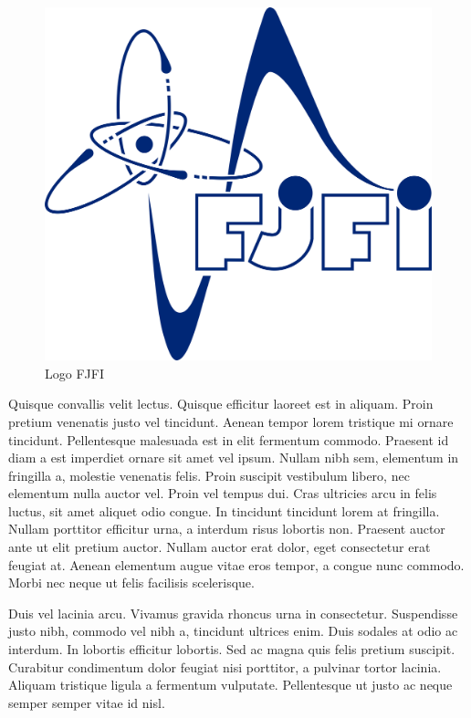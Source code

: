 \documentclass{article}
\begin{document}
\begin{figure}[!htp]
	\begin{center}
		\includegraphics[scale=0.1]{logo-fjfi.png}
	\end{center}
	\caption{Logo FJFI}
	\label{fig:logo-fjfi2}
\end{figure}

Quisque convallis velit lectus. Quisque efficitur laoreet est in aliquam. Proin pretium venenatis justo vel tincidunt. Aenean tempor lorem tristique mi ornare tincidunt. Pellentesque malesuada est in elit fermentum commodo. Praesent id diam a est imperdiet ornare sit amet vel ipsum. Nullam nibh sem, elementum in fringilla a, molestie venenatis felis. Proin suscipit vestibulum libero, nec elementum nulla auctor vel. Proin vel tempus dui. Cras ultricies arcu in felis luctus, sit amet aliquet odio congue. In tincidunt tincidunt lorem at fringilla. Nullam porttitor efficitur urna, a interdum risus lobortis non. Praesent auctor ante ut elit pretium auctor. Nullam auctor erat dolor, eget consectetur erat feugiat at. Aenean elementum augue vitae eros tempor, a congue nunc commodo. Morbi nec neque ut felis facilisis scelerisque.

Duis vel lacinia arcu. Vivamus gravida rhoncus urna in consectetur. Suspendisse justo nibh, commodo vel nibh a, tincidunt ultrices enim. Duis sodales at odio ac interdum. In lobortis efficitur lobortis. Sed ac magna quis felis pretium suscipit. Curabitur condimentum dolor feugiat nisi porttitor, a pulvinar tortor lacinia. Aliquam tristique ligula a fermentum vulputate. Pellentesque ut justo ac neque semper semper vitae id nisl.
\end{document}
